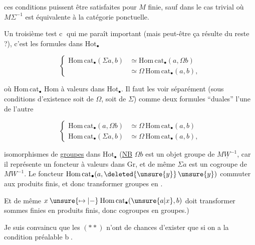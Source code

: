 ces  conditions puissent être satisfaites pour $M$ finie, sauf dans le cas trivial où  $M\Sigma^{-1}$ est équivalente à la catégorie ponctuelle.

Un troisième test \textcircled{\scriptsize c} qui me paraît important (mais peut-être ça résulte du reste ?), c'est les formules dans $\mathrm{Hot}_{\bullet}$

\[
 \left\{\begin{aligned}
 \mathrm{Hom\,cat}_{\bullet}(\Sigma a,b)&\simeq\mathrm{Hom\,cat}_{\bullet}(a,\Omega b)\\
 &\simeq\Omega\,\mathrm{Hom\,cat}_{\bullet}(a,b),
 \end{aligned}\right.\tag*{$(*)$}
\]

où  $\mathrm{Hom\,cat}_{\bullet}$   $\mathrm{Hom}$  à valeurs dans $\mathrm{Hot}_{\bullet}$. Il faut les voir séparément (sous conditions d'existence soit de $\Omega$, soit de $\Sigma$) comme deux formules ``duales'' l'une de l'autre

\[
 \left\{\begin{aligned}
 \mathrm{Hom\,cat}_{\bullet}(a,\Omega b)&\simeq\Omega\,\mathrm{Hom\,cat}_{\bullet}(a,b)\\
 \mathrm{Hom\,cat}_{\bullet}(\Sigma a,b)&\simeq\Omega\,\mathrm{Hom\,cat}_{\bullet}(a,b),
 \end{aligned}\right.\tag*{$(**)$}
\]

isomorphismes de \uline{groupes} dans $\mathrm{Hot}_{\bullet}$ (\uline{NB} $\Omega b$ est un objet groupe de $M\underline W^{-1}$, car il représente un foncteur à valeurs dans $\mathrm{Gr}$, et de même $\Sigma a$ est un cogroupe de $MW^{-1}$. Le foncteur $\mathrm{Hom\,cat}_{\bullet}(a,\deleted{\unsure{y}}\,\unsure{y})$   commuter aux produits finis, et donc transformer  groupes en .


Et de même  $x\mathbin{\unsure{\mapsto|-}}\mathrm{Hom\,cat}_{\bullet}(\unsure{a|x},b)$ doit transformer sommes finies en produits finis, donc cogroupes en groupes.)

Je  suis convaincu que les  $(**)$ n'ont de chances d'exister que si on a la condition préalable \textcircled{\scriptsize b}.

